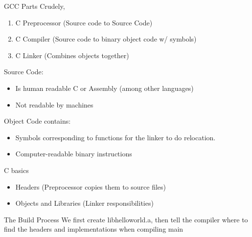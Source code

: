 \documentclass{../lecture}
\begin{document}
\begin{frame}{GCC Parts}
  Crudely,
  \begin{enumerate}
    \item C Preprocessor (Source code to Source Code)
    \item C Compiler (Source code to binary object code w/ symbols)
    \item C Linker (Combines objects together)
  \end{enumerate}
  Source Code:
  \begin{itemize}
    \item Is human readable C or Assembly (among other languages)
    \item Not readable by machines
  \end{itemize}
  Object Code contains:
  \begin{itemize}
    \item Symbols corresponding to functions for the linker to do relocation.
    \item Computer-readable binary instructions
  \end{itemize}
\end{frame}

\begin{frame}[fragile]{C basics}
  \begin{itemize}
    \item Headers (Preprocessor copies them to source files)
    \item Objects and Libraries (Linker responsibilities)
  \end{itemize}



\end{frame}

\begin{frame}[fragile]{The Build Process}
We first create libhelloworld.a, then tell the compiler where to find the
headers and implementations when compiling main

\end{frame}
\end{document}
